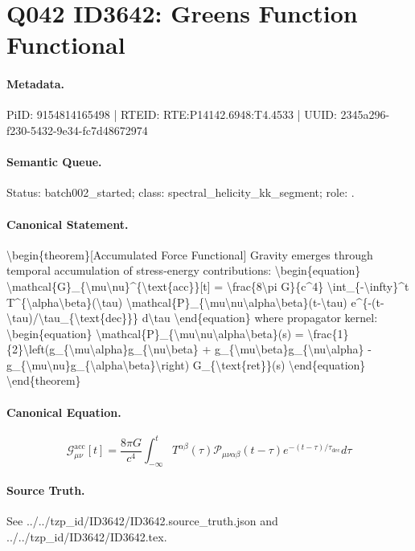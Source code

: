 \section*{Q042 ID3642: Greens Function Functional}
\paragraph{Metadata.}
PiID: 9154814165498 | RTEID: RTE:P14142.6948:T4.4533 | UUID: 2345a296-f230-5432-9e34-fc7d48672974

\paragraph{Semantic Queue.}
Status: batch002\_started; class: spectral\_helicity\_kk\_segment; role: .

\paragraph{Canonical Statement.}
\textbackslash{}begin\{theorem\}[Accumulated Force Functional] Gravity emerges through temporal accumulation of stress-energy contributions: \textbackslash{}begin\{equation\} \textbackslash{}mathcal\{G\}\_\{\textbackslash{}mu\textbackslash{}nu\}\textasciicircum{}\{\textbackslash{}text\{acc\}\}[t] = \textbackslash{}frac\{8\textbackslash{}pi G\}\{c\textasciicircum{}4\} \textbackslash{}int\_\{-\textbackslash{}infty\}\textasciicircum{}t T\textasciicircum{}\{\textbackslash{}alpha\textbackslash{}beta\}(\textbackslash{}tau) \textbackslash{}mathcal\{P\}\_\{\textbackslash{}mu\textbackslash{}nu\textbackslash{}alpha\textbackslash{}beta\}(t-\textbackslash{}tau) e\textasciicircum{}\{-(t-\textbackslash{}tau)/\textbackslash{}tau\_\{\textbackslash{}text\{dec\}\}\} d\textbackslash{}tau \textbackslash{}end\{equation\} where propagator kernel: \textbackslash{}begin\{equation\} \textbackslash{}mathcal\{P\}\_\{\textbackslash{}mu\textbackslash{}nu\textbackslash{}alpha\textbackslash{}beta\}(s) = \textbackslash{}frac\{1\}\{2\}\textbackslash{}left(g\_\{\textbackslash{}mu\textbackslash{}alpha\}g\_\{\textbackslash{}nu\textbackslash{}beta\} + g\_\{\textbackslash{}mu\textbackslash{}beta\}g\_\{\textbackslash{}nu\textbackslash{}alpha\} - g\_\{\textbackslash{}mu\textbackslash{}nu\}g\_\{\textbackslash{}alpha\textbackslash{}beta\}\textbackslash{}right) G\_\{\textbackslash{}text\{ret\}\}(s) \textbackslash{}end\{equation\} \textbackslash{}end\{theorem\}

\paragraph{Canonical Equation.}
\[
\begin{equation} \mathcal{G}_{\mu\nu}^{\text{acc}}[t] = \frac{8\pi G}{c^4} \int_{-\infty}^t T^{\alpha\beta}(\tau) \mathcal{P}_{\mu\nu\alpha\beta}(t-\tau) e^{-(t-\tau)/\tau_{\text{dec}}} d\tau \end{equation}
\]

\paragraph{Source Truth.}
See ../../tzp\_id/ID3642/ID3642.source\_truth.json and ../../tzp\_id/ID3642/ID3642.tex.
